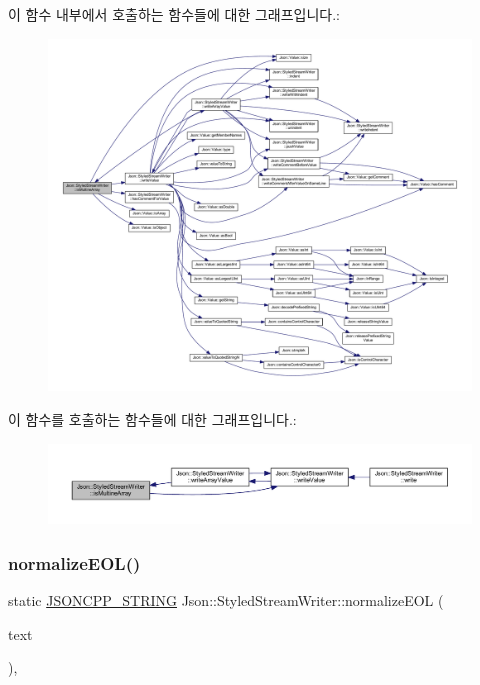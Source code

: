 이 함수 내부에서 호출하는 함수들에 대한 그래프입니다.\+:
\nopagebreak
\begin{figure}[H]
\begin{center}
\leavevmode
\includegraphics[width=350pt]{class_json_1_1_styled_stream_writer_a88f4d342cf25c73aabf77c1b8ba01e44_cgraph}
\end{center}
\end{figure}
이 함수를 호출하는 함수들에 대한 그래프입니다.\+:\nopagebreak
\begin{figure}[H]
\begin{center}
\leavevmode
\includegraphics[width=350pt]{class_json_1_1_styled_stream_writer_a88f4d342cf25c73aabf77c1b8ba01e44_icgraph}
\end{center}
\end{figure}
\mbox{\label{class_json_1_1_styled_stream_writer_ae481322d7a439881b257ba7aeda6d19b}} 
\subsubsection{\texorpdfstring{normalize\+E\+O\+L()}{normalizeEOL()}}
{\footnotesize\ttfamily static \hyperlink{json_8h_a1e723f95759de062585bc4a8fd3fa4be}{J\+S\+O\+N\+C\+P\+P\+\_\+\+S\+T\+R\+I\+NG} Json\+::\+Styled\+Stream\+Writer\+::normalize\+E\+OL (\begin{DoxyParamCaption}\item[{const \hyperlink{json_8h_a1e723f95759de062585bc4a8fd3fa4be}{J\+S\+O\+N\+C\+P\+P\+\_\+\+S\+T\+R\+I\+NG} \&}]{text }\end{DoxyParamCaption})\hspace{0.3cm}{\ttfamily [static]}, {\ttfamily [private]}}

